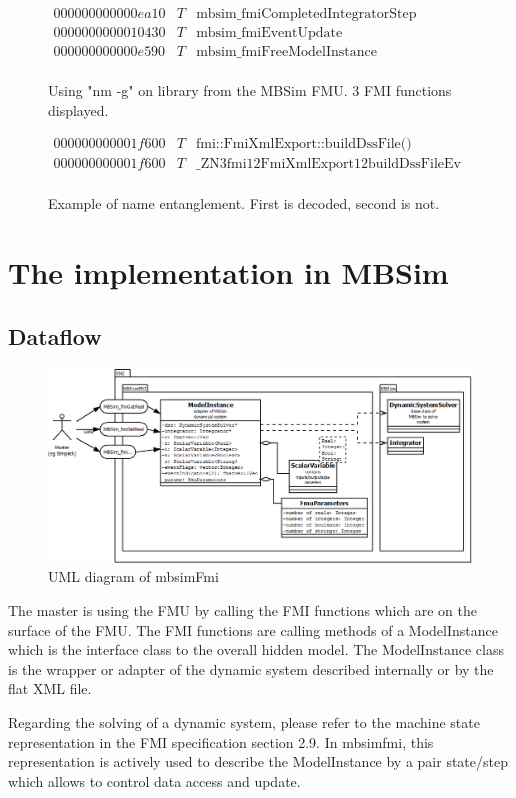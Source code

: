 \documentclass[10pt,a4paper]{report}
\begin{document}
\begin{figure}
  \centering
  $
  \begin{array}{lll} 
  000000000000ea10 & T & \text{mbsim\_fmiCompletedIntegratorStep} \\ 
  0000000000010430 & T & \text{mbsim\_fmiEventUpdate} \\
  000000000000e590 & T & \text{mbsim\_fmiFreeModelInstance} \\
  \end{array}
  $
  \caption{Using "nm -g" on library from the MBSim FMU. 3 FMI functions displayed.}
  \label{fig:libraryName}
  
  $
  \begin{array}{lll} 
  000000000001f600 & T & \text{fmi::FmiXmlExport::buildDssFile()} \\
  000000000001f600 & T & \text{\_ZN3fmi12FmiXmlExport12buildDssFileEv} \\
  \end{array}
  $
  \caption{Example of name entanglement. First is decoded, second is not.}
  \label{fig:entanglement}
\end{figure}
%
\chapter{The implementation in MBSim}
%
\section{Dataflow}
%
\begin{figure}[h]
	\centering
	\includegraphics[width=\textwidth]{fmi-uml}
	\caption{UML diagram of mbsimFmi}
	\label{fig:uml}
\end{figure}
%
The master is using the FMU by calling the FMI functions which are on the surface of the FMU. The FMI functions are calling methods of a ModelInstance which is the interface class to the overall hidden model. The ModelInstance class is the wrapper or adapter of the dynamic system described internally or by the flat XML file.\par
%
Regarding the solving of a dynamic system, please refer to the machine state representation in the FMI specification section 2.9. In mbsimfmi, this representation is actively used to describe the ModelInstance by a pair state/step which allows to control data access and update.
%
\end{document}
